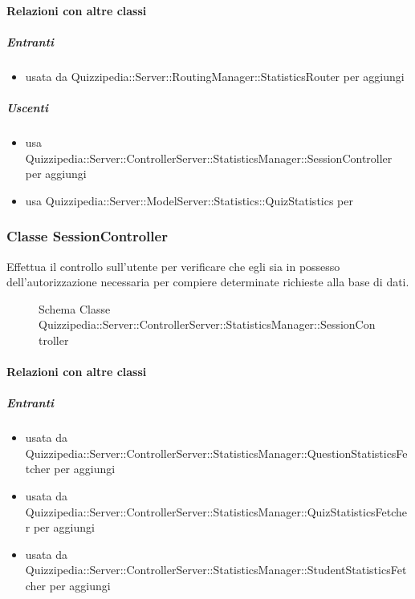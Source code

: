 \paragraph{Relazioni con altre classi}
\subparagraph{Entranti}
\begin{itemize}
\item usata da Quizzipedia::Server::RoutingManager::StatisticsRouter per aggiungi
\end{itemize}
\subparagraph{Uscenti}
\begin{itemize}
\item usa Quizzipedia::Server::ControllerServer::StatisticsManager::SessionController per aggiungi
\item usa Quizzipedia::Server::ModelServer::Statistics::QuizStatistics per 
\end{itemize}
\subsubsection{Classe SessionController}
Effettua il controllo sull'utente per verificare che egli sia in possesso dell'autorizzazione necessaria per compiere determinate richieste alla base di dati.
\begin{figure}[H]
\centering
\noindent{}
\caption[Schema Classe SessionController]{Schema Classe Quizzipedia::Server::ControllerServer::StatisticsManager::SessionController}
\end{figure}
\paragraph{Relazioni con altre classi}
\subparagraph{Entranti}
\begin{itemize}
\item usata da Quizzipedia::Server::ControllerServer::StatisticsManager::QuestionStatisticsFetcher per aggiungi
\item usata da Quizzipedia::Server::ControllerServer::StatisticsManager::QuizStatisticsFetcher per aggiungi
\item usata da Quizzipedia::Server::ControllerServer::StatisticsManager::StudentStatisticsFetcher per aggiungi
\end{itemize}
